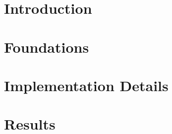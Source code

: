 \documentclass[]{report}   %
\begin{document}


\tableofcontents
\cleardoublepage

%
\cleardoublepage

\chapter{Introduction}             %
\label{einleitung}

\chapter{Foundations}             %
\label{literatur}

\chapter{Implementation Details}             %
\label{implementierung}

\chapter{Results}             %
\label{experimente}

\label{schluss}


\printglossary[type=\acronymtype, title=Abbreviations, toctitle=Abbreviations]

\printglossary[title=Glossar, toctitle=Glossar]

\printbibliography

\appendix


\end{document}
